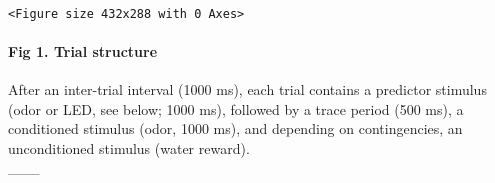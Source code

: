 \documentclass[11pt]{article}
\begin{document}
    \begin{center}
    \end{center}
    { \hspace*{\fill} \\}
    
    
    \begin{verbatim}
<Figure size 432x288 with 0 Axes>
    \end{verbatim}

    
    \paragraph{Fig 1. Trial structure}\label{fig-1.-trial-structure}

After an inter-trial interval (1000 ms), each trial contains a predictor
stimulus (odor or LED, see below; 1000 ms), followed by a trace period
(500 ms), a conditioned stimulus (odor, 1000 ms), and depending on
contingencies, an unconditioned stimulus (water reward).\\
\_\_\_
\end{document}
